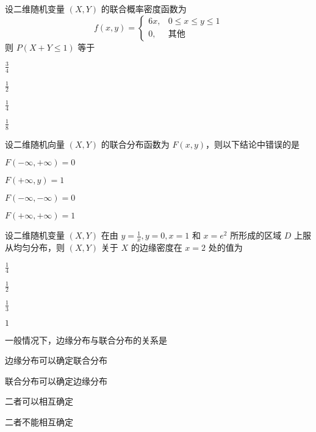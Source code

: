 \documentclass{exam-zh}
\begin{document}
\begin{question}
  设二维随机变量 $(X, Y)$ 的联合概率密度函数为  
  $$f(x, y) = 
  \begin{cases} 
  6x, & 0 \leq x \leq y \leq 1 \\ 
  0, & \text{其他} 
  \end{cases}$$ 
  则 $P(X + Y \leq 1)$ 等于 \paren[C]
  \begin{choices}
    \item $\frac{3}{4}$  
    \item $\frac{1}{2}$  
    \item $\frac{1}{4}$  
    \item $\frac{1}{8}$  
  \end{choices}
\end{question}

\begin{question}
  设二维随机向量 $(X, Y)$ 的联合分布函数为 $F(x, y)$，则以下结论中错误的是 \paren[B]
  \begin{choices}
    \item $F(-\infty, +\infty) = 0$  
    \item $F(+\infty, y) = 1$  
    \item $F(-\infty, -\infty) = 0$  
    \item $F(+\infty, +\infty) = 1$  
  \end{choices}
\end{question}

\begin{question}
  设二维随机变量 $(X, Y)$ 在由 $y = \frac{1}{x}, y = 0, x = 1$ 和 $x = e^2$ 所形成的区域 $D$ 上服从均匀分布，则 $(X, Y)$ 关于 $X$ 的边缘密度在 $x = 2$ 处的值为 \paren[A]
  \begin{choices}
    \item $\frac{1}{4}$  
    \item $\frac{1}{2}$  
    \item $\frac{1}{3}$  
    \item $1$  
  \end{choices}
\end{question}

\begin{question}
  一般情况下，边缘分布与联合分布的关系是 \paren[B]
  \begin{choices}
    \item 边缘分布可以确定联合分布  
    \item 联合分布可以确定边缘分布  
    \item 二者可以相互确定  
    \item 二者不能相互确定  
  \end{choices}
\end{question}
\end{document}
